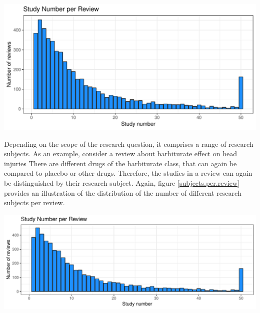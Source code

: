\label{studies.per.review}
\begin{knitrout}
\color{fgcolor}

{\centering \includegraphics[width=\textwidth-3cm]{figure/ch02_figunnamed-chunk-3-1} 

}



\end{knitrout}

Depending on the scope of the research question, it comprises a range of research subjects. As an example, consider a review about barbiturate effect on head injuries 
There are different drugs of the barbiturate class, that can again be compared to placebo or other drugs. Therefore, the studies in a review can again be distinguished by their research subject. Again, figure \ref{subjects.per.review} provides an illustration of the distribution of the number of different research subjects per review.

\label{subjects.per.review}
\begin{knitrout}
\color{fgcolor}

{\centering \includegraphics[width=\textwidth-3cm]{figure/ch02_figunnamed-chunk-4-1} 

}



\end{knitrout}

